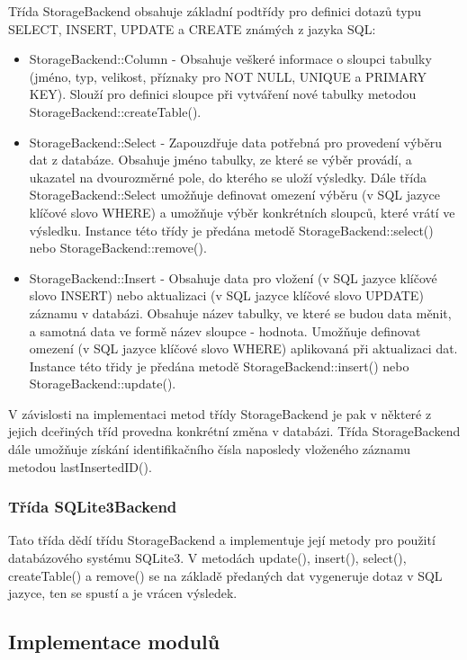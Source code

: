 Třída StorageBackend obsahuje základní podtřídy pro definici dotazů typu SELECT, INSERT, UPDATE a CREATE známých z
jazyka SQL:

\begin{itemize}
\item StorageBackend::Column - Obsahuje veškeré informace o sloupci tabulky (jméno, typ, velikost,
příznaky pro NOT NULL, UNIQUE a PRIMARY KEY). %
Slouží pro definici sloupce při vytváření
nové tabulky metodou StorageBackend::createTable().
\item StorageBackend::Select - Zapouzdřuje data potřebná pro provedení výběru dat z databáze. Obsahuje jméno tabulky,
ze které se výběr provádí, a ukazatel na dvourozměrné pole, do kterého se uloží
výsledky. Dále třída StorageBackend::Select umožňuje
definovat omezení výběru (v SQL jazyce klíčové slovo WHERE) a umožňuje výběr konkrétních sloupců, které vrátí ve výsledku.
Instance této třídy je předána metodě StorageBackend::select() nebo StorageBackend::remove().
\item StorageBackend::Insert - Obsahuje data pro vložení (v SQL jazyce klíčové
slovo INSERT) nebo aktualizaci (v SQL jazyce klíčové slovo UPDATE)
záznamu v databázi. Obsahuje název tabulky, ve které se budou data měnit, a samotná data ve formě název sloupce - hodnota.
Umožňuje definovat omezení (v SQL jazyce klíčové slovo WHERE) aplikovaná při aktualizaci dat. Instance této třidy je předána metodě
StorageBackend::insert() nebo StorageBackend::update().
\end{itemize}

V závislosti na implementaci metod třídy StorageBackend je pak v některé z
jejich dceřiných tříd provedna konkrétní změna v
databázi. Třída StorageBackend dále umožňuje získání identifikačního čísla naposledy vloženého záznamu metodou lastInsertedID().


\subsubsection{Třída SQLite3Backend}

Tato třída dědí třídu StorageBackend a implementuje její metody pro použití databázového systému SQLite3. V metodách
update(), insert(), select(), createTable() a remove() se na základě předaných
dat vygeneruje dotaz v SQL jazyce, ten se spustí
a je vrácen výsledek.

\subsection{Implementace modulů}
\label{implementace_moduly}

